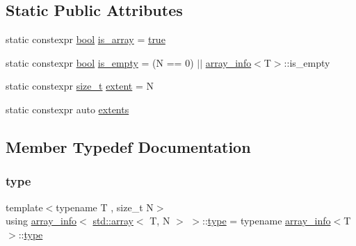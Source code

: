 \subsection*{Static Public Attributes}
\begin{DoxyCompactItemize}
\item 
static constexpr \mbox{\hyperlink{asdl_8h_af6a258d8f3ee5206d682d799316314b1}{bool}} \mbox{\hyperlink{structarray__info_3_01std_1_1array_3_01_t_00_01_n_01_4_01_4_a5ee93c78021c504dc16e091dda56ec02}{is\+\_\+array}} = \mbox{\hyperlink{asdl_8h_af6a258d8f3ee5206d682d799316314b1a08f175a5505a10b9ed657defeb050e4b}{true}}
\item 
static constexpr \mbox{\hyperlink{asdl_8h_af6a258d8f3ee5206d682d799316314b1}{bool}} \mbox{\hyperlink{structarray__info_3_01std_1_1array_3_01_t_00_01_n_01_4_01_4_a95b6d29fee19cde4837d3a2f62d51e00}{is\+\_\+empty}} = (N == 0) $\vert$$\vert$ \mbox{\hyperlink{structarray__info}{array\+\_\+info}}$<$T$>$\+::is\+\_\+empty
\item 
static constexpr \mbox{\hyperlink{detail_2common_8h_a801d6a451a01953ef8cbae6feb6a3638}{size\+\_\+t}} \mbox{\hyperlink{structarray__info_3_01std_1_1array_3_01_t_00_01_n_01_4_01_4_ab89fea43d0533912fd3495c3fbe0a303}{extent}} = N
\item 
static constexpr auto \mbox{\hyperlink{structarray__info_3_01std_1_1array_3_01_t_00_01_n_01_4_01_4_a1d696d962743dc70469b7458bbb60dcf}{extents}}
\end{DoxyCompactItemize}


\subsection{Member Typedef Documentation}
\mbox{\label{structarray__info_3_01std_1_1array_3_01_t_00_01_n_01_4_01_4_a0023c48fec7c0b11090f45b7ceb9a307}} 
\subsubsection{\texorpdfstring{type}{type}}
{\footnotesize\ttfamily template$<$typename T , size\+\_\+t N$>$ \\
using \mbox{\hyperlink{structarray__info}{array\+\_\+info}}$<$ \mbox{\hyperlink{_s_d_l__opengl__glext_8h_a52f38e7d822a46377fde7a02708eedb1}{std\+::array}}$<$ T, N $>$ $>$\+::\mbox{\hyperlink{structarray__info_3_01std_1_1array_3_01_t_00_01_n_01_4_01_4_a0023c48fec7c0b11090f45b7ceb9a307}{type}} =  typename \mbox{\hyperlink{structarray__info}{array\+\_\+info}}$<$T$>$\+::\mbox{\hyperlink{structarray__info_3_01std_1_1array_3_01_t_00_01_n_01_4_01_4_a0023c48fec7c0b11090f45b7ceb9a307}{type}}}



